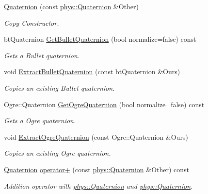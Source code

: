 \begin{DoxyCompactItemize}
\hyperlink{classphys_1_1Quaternion_a46d08f43b0b638a256344b3919ba9e0d}{Quaternion} (const \hyperlink{classphys_1_1Quaternion}{phys::Quaternion} \&Other)
\begin{DoxyCompactList}\small\item\em Copy Constructor. \item\end{DoxyCompactList}\item 
btQuaternion \hyperlink{classphys_1_1Quaternion_a053f994770b600ae153a142bb4ba7d33}{GetBulletQuaternion} (bool normalize=false) const 
\begin{DoxyCompactList}\small\item\em Gets a Bullet quaternion. \item\end{DoxyCompactList}\item 
void \hyperlink{classphys_1_1Quaternion_a10d3582b2731e70279d7bab43173f317}{ExtractBulletQuaternion} (const btQuaternion \&Ours)
\begin{DoxyCompactList}\small\item\em Copies an existing Bullet quaternion. \item\end{DoxyCompactList}\item 
Ogre::Quaternion \hyperlink{classphys_1_1Quaternion_aa22645e2e2972007bcf61cd2f8e506d0}{GetOgreQuaternion} (bool normalize=false) const 
\begin{DoxyCompactList}\small\item\em Gets a Ogre quaternion. \item\end{DoxyCompactList}\item 
void \hyperlink{classphys_1_1Quaternion_a942fab675a0b124e1dc5e2febab113e6}{ExtractOgreQuaternion} (const Ogre::Quaternion \&Ours)
\begin{DoxyCompactList}\small\item\em Copies an existing Ogre quaternion. \item\end{DoxyCompactList}\item 
\hyperlink{classphys_1_1Quaternion}{Quaternion} \hyperlink{classphys_1_1Quaternion_af3f9a9b5835400dc5b83ba06bf9845b0}{operator+} (const \hyperlink{classphys_1_1Quaternion}{phys::Quaternion} \&Other) const 
\begin{DoxyCompactList}\small\item\em Addition operator with \hyperlink{classphys_1_1Quaternion}{phys::Quaternion} and \hyperlink{classphys_1_1Quaternion}{phys::Quaternion}. \item\end{DoxyCompactList}\item 

\end{DoxyCompactItemize}
